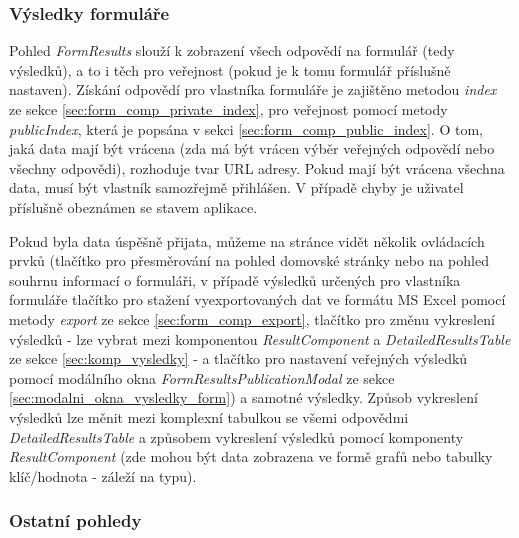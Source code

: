 		\subsubsection{Výsledky formuláře}\label{sec:pohled_vysledky_formulare} %
		Pohled \textit{FormResults} slouží k zobrazení všech odpovědí na formulář (tedy výsledků), a to i těch pro veřejnost (pokud je k tomu formulář příslušně nastaven). Získání odpovědí pro vlastníka formuláře je zajištěno metodou \textit{index} ze sekce \ref{sec:form_comp_private_index}, pro veřejnost pomocí metody \textit{publicIndex}, která je popsána v sekci \ref{sec:form_comp_public_index}. O tom, jaká data mají být vrácena (zda má být vrácen výběr veřejných odpovědí nebo všechny odpovědi), rozhoduje tvar URL adresy. Pokud mají být vrácena všechna data, musí být vlastník samozřejmě přihlášen. V případě chyby je uživatel příslušně obeznámen se stavem aplikace.
		
		Pokud byla data úspěšně přijata, můžeme na stránce vidět několik ovládacích prvků (tlačítko pro přesměrování na pohled domovské stránky nebo na pohled souhrnu informací o formuláři, v případě výsledků určených pro vlastníka formuláře tlačítko pro stažení vyexportovaných dat ve formátu MS Excel pomocí metody \textit{export} ze sekce \ref{sec:form_comp_export}, tlačítko pro změnu vykreslení výsledků - lze vybrat mezi komponentou \textit{ResultComponent} a \textit{DetailedResultsTable} ze sekce \ref{sec:komp_vysledky} - a tlačítko pro nastavení veřejných výsledků pomocí modálního okna \textit{FormResultsPublicationModal} ze sekce \ref{sec:modalni_okna_vysledky_form}) a samotné výsledky. Způsob vykreslení výsledků lze měnit mezi komplexní tabulkou se všemi odpovědmi \textit{DetailedResultsTable} a způsobem vykreslení výsledků  pomocí komponenty \textit{ResultComponent} (zde mohou být data zobrazena ve formě grafů nebo tabulky klíč/hodnota - záleží na typu).
		
		\subsubsection{Ostatní pohledy} %
